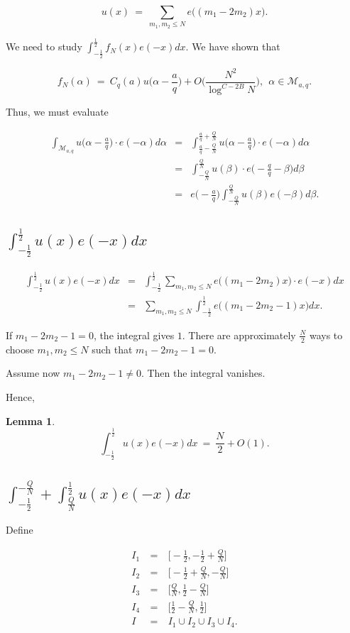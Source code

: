 \documentclass[12pt,letterpaper]{report}
\newcommand\be{\begin{equation}}
\newcommand\ee{\end{equation}}
\newcommand\bea{\begin{eqnarray}}
\newcommand\eea{\end{eqnarray}}
\newcommand{\foh}{\frac{1}{2}}  %
\newtheorem{lem}[thm]{Lemma}
\begin{document}
\be u(x) \ = \ \sum_{m_1,m_2 \le N} e\Big( (m_1 - 2m_2)x \Big).
\ee

We need to study $\int_{-\foh}^\foh f_N(x) e(-x)dx$. We have shown
that

\be f_N(\alpha) \ = \ C_q(a) u\Big( \alpha - \frac{a}{q} \Big) +
O\Big( \frac{N^2}{\log^{C-2B} N} \Big), \ \ \alpha \in
\mathcal{M}_{a,q}. \ee

Thus, we must evaluate

\bea \int_{\mathcal{M}_{a,q}} u\Big( \alpha - \frac{a}{q} \Big)
\cdot e(-\alpha)d\alpha  &=&
\int_{\frac{a}{q}-\frac{Q}{N}}^{\frac{a}{q}+\frac{Q}{N}} u\Big(
\alpha - \frac{a}{q} \Big) \cdot e(-\alpha) d\alpha \nonumber\\
&=& \int_{-\frac{Q}{N}}^{\frac{Q}{N}} u(\beta) \cdot
e\Big(-\frac{q}{q} - \beta\Big) d\beta \nonumber\\ &=& e\Big(
-\frac{a}{q} \Big) \int_{-\frac{Q}{N}}^{\frac{Q}{N}} u(\beta)
e(-\beta)d\beta. \eea


\subsection{$\int_{-\foh}^{\foh} u(x)
e(-x)dx$}

\bea \int_{-\foh}^{\foh} u(x) e(-x)dx &=& \int_{-\foh}^{\foh}
\sum_{m_1,m_2 \le N} e\Big( (m_1 - 2m_2)x \Big) \cdot e(-x)dx
\nonumber\\ &=& \sum_{m_1,m_2 \le N} \int_{-\foh}^{\foh} e\Big(
(m_1 - 2m_2 - 1)x \Big)dx. \eea

If $m_1 - 2m_2 - 1 = 0$, the integral gives $1$. There are
approximately $\frac{N}{2}$ ways to choose $m_1, m_2 \le N$ such
that $m_1 - 2m_2 - 1 = 0$.

Assume now $m_1 - 2m_2 - 1 \neq 0$. Then the integral vanishes.

Hence,

\begin{lem}
\be \int_{-\foh}^{\foh} u(x) e(-x)dx \ = \ \frac{N}{2} + O(1). \ee
\end{lem}


\subsection{ $\int_{-\foh}^{-\frac{Q}{N}} + \int_{\frac{Q}{N}}^{\foh} u(x)
e(-x)dx$}

Define

\bea I_1 & \ = \ & \Big[ -\foh, -\foh + \frac{Q}{N} \Big]
\nonumber\\ I_2 & \ = \ & \Big[ -\foh + \frac{Q}{N}, -\frac{Q}{N}
\Big] \nonumber\\ I_3 & \ = \ & \Big[ \frac{Q}{N}, \foh -
\frac{Q}{N} \Big] \nonumber\\ I_4 & \ = \ & \Big[ \foh -
\frac{Q}{N}, \foh \Big] \nonumber\\ I & \ = \ & I_1 \cup I_2 \cup
I_3 \cup I_4 . \eea
\end{document}
